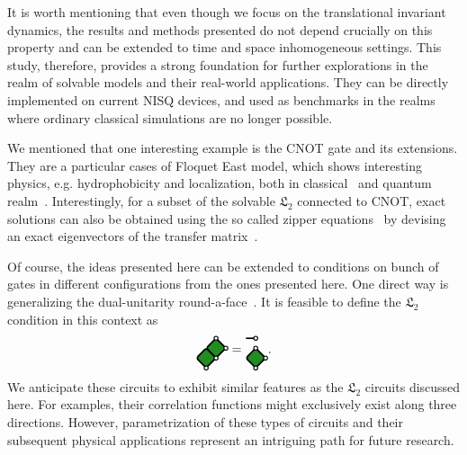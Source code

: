 \documentclass[aps,prx,twocolumn,notitlepage,nofootinbib,nobalancelastpage]{revtex4-2}
\theoremstyle{break}
\newcommand{\1}{\mathbbm{1}}
\theoremstyle{plain}
\theoremstyle{plain}
\theoremstyle{plain}
\newcommand{\MYcircle}[2]{
\draw[thick, fill=white] (#1,#2) circle (0.1cm); }
\begin{document}
It is worth mentioning that even though we focus on the translational invariant dynamics, the results and methods presented do not depend crucially on this property and can be extended to time and space inhomogeneous settings. 
This study, therefore, provides a strong foundation for further explorations in the realm of solvable models and their real-world applications. 
They can be directly implemented on current NISQ devices, and used as benchmarks in the realms where ordinary classical simulations are no longer possible.

We mentioned that one interesting example is the CNOT gate and its extensions. They are a particular cases of Floquet East model, which shows interesting physics, e.g. hydrophobicity and localization, both in classical~\cite{klobas2023exact} and quantum realm~\cite{bertini2023localised}.
Interestingly, for a subset of the solvable $\mathfrak{L}_2$ connected to CNOT,  exact solutions can also be obtained using the so called zipper equations~\cite{klobas2021exact} by devising an exact eigenvectors of the transfer matrix~\cite{unpublished}. 

Of course, the ideas presented here can be extended to conditions on bunch of gates in different configurations from the ones presented here.
One direct way is generalizing the dual-unitarity
round-a-face~\cite{prosen2021manybody}. It is feasible to define the $\mathfrak{L}_2$ condition in this context as
\begin{equation}
\begin{tikzpicture}[baseline=(current  bounding  box.center), scale=0.55]
\draw[very thick, fill=mygreen,rounded corners=2pt](0,0.5)--(0.5,0)--(0,-0.5)--(-0.5,0)--cycle;
\draw[very thick,fill=mygreen,rounded corners=2pt](-0.5,0)--(0,-0.5)--(-0.5,-1)--(-1,-0.5)--cycle;
\MYcircle{0}{0.5}
\MYcircle{0.5}{0}
\MYcircle{0}{-0.5}
\MYcircle{-0.5}{-1}
\end{tikzpicture}
=
\begin{tikzpicture}[baseline=(current  bounding  box.center), scale=0.55]
\draw[very thick,fill=mygreen,rounded corners=2pt](-0.5,0)--(0,-0.5)--(-0.5,-1)--(-1,-0.5)--cycle;
\draw[very thick](-1,0.5)--(-0.5,0.5);
\MYcircle{-0.5}{0.5}
\MYcircle{-0.5}{0}
\MYcircle{0}{-0.5}
\MYcircle{-0.5}{-1}
\end{tikzpicture}.
\end{equation}
We anticipate these circuits to exhibit similar features as the $\mathfrak{L}_2$ circuits discussed here. For examples, their correlation functions might exclusively exist along three directions. However, parametrization of these types of circuits and their subsequent physical applications represent an intriguing path for future research.
\end{document}
